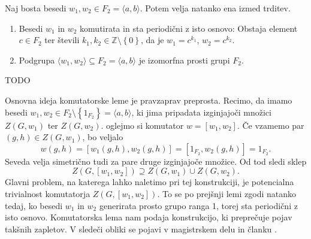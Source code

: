 \documentclass[mat1, tisk]{fmfdelo}
\numberwithin{equation}{section}  %
\begin{document}
\begin{lema}
\label{lem_posledica_nielsen_schreier}
Naj bosta besedi $w_1, w_2 \in F_2 = \langle a, b \rangle$. Potem velja natanko ena izmed trditev. \begin{enumerate}
    \item Besedi $w_1$ in $w_2$ komutirata in sta periodični z isto osnovo: Obstaja element $c \in F_2$ ter števili $k_1, k_2 \in \mathbb{Z} \setminus \left\{ 0\right\}$, da je $w_1= c^{k_1}$, $w_2 = c^{k_2}$. 
    \item Podgrupa $\langle w_1, w_2 \rangle \subseteq F_2 = \langle a, b \rangle$ je izomorfna prosti grupi $F_2$.
\end{enumerate}
\end{lema}
\begin{dokaz}
    TODO
\end{dokaz}

Osnovna ideja komutatorske leme je pravzaprav preprosta. Recimo, da imamo besedi $w_1, w_2 \in F_2 \setminus \left\{ 1_{F_2}\right\}  = \langle a,b \rangle$, ki jima pripadata izginjajoči množici $Z(G, w_1)$ ter $Z(G, w_2)$.
oglejmo si komutator $w = [w_1, w_2]$. Če vzamemo par $(g, h) \in Z(G, w_1)$, bo veljalo \begin{equation*}
w(g,h) = [w_1(g,h), w_2(g,h)] = [1_{F_2}, w_2(g,h)] = 1_{F_2}.
\end{equation*}  
  Seveda velja simetrično tudi za pare druge izginjajoče množice. Od tod sledi sklep \begin{equation*}
  Z(G, [w_1, w_2]) \supseteq Z(G, w_1) \cup Z(G, w_2).
  \end{equation*}  
Glavni problem, na katerega lahko naletimo pri tej konstrukciji, je potencialna trivialnost komutatorja $Z(G, [w_1, w_2])$.
To se po prejšnji lemi zgodi natanko tedaj, ko besedi $w_1$ in $w_2$ generirata prosto grupo ranga 1, torej sta periodični z isto osnovo. 
Komutatorska lema nam podaja konstrukcijo, ki preprečuje pojav takšnih zapletov. V sledeči obliki se pojavi v magistrskem delu \cite{Schneider_2016} in članku \cite{Kozma_Thom_2016}.

\end{document}
